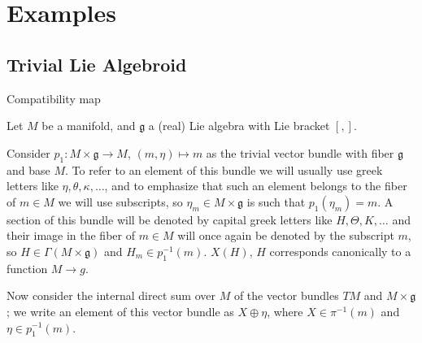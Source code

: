 \begin{definition}

\end{definition}

\begin{definition}

\end{definition}

\begin{definition}[Pullbacks]

\end{definition}

\begin{definition}[Quotients]

\end{definition}

\section{Examples}

\subsection{Trivial Lie Algebroid}

Compatibility map

Let $M$ be a manifold, and $\mathfrak g$ a (real) Lie algebra with Lie bracket $[,]$. 

Consider $p_1: M \times \mathfrak g \to M$, $(m, \eta) \mapsto m$ as the trivial vector bundle with fiber $\mathfrak g$ and base $M$. To refer to an element of this bundle we will usually use greek letters like $\eta, \theta, \kappa, \dots$, and to emphasize that such an element belongs to the fiber of $m \in M$ we will use subscripts, so $\eta_m \in M \times \mathfrak g$ is such that $p_1(\eta_m) = m$. A section of this bundle will be denoted by capital greek letters like $H, \Theta, K, \dots$ and their image in the fiber of $m \in M$ will once again be denoted by the subscript $m$, so $H \in \Gamma(M \times \mathfrak g)$ and $H_m \in p_1^{-1}(m)$. $X(H)$, $H$ corresponds canonically to a function $M \to g$.

Now consider the internal direct sum over $M$ of the vector bundles $TM$ and $M \times \mathfrak g$; we write an element of this vector bundle as $X \oplus \eta$, where $X \in \pi^{-1}(m)$ and $\eta \in p_1^{-1}(m)$.

